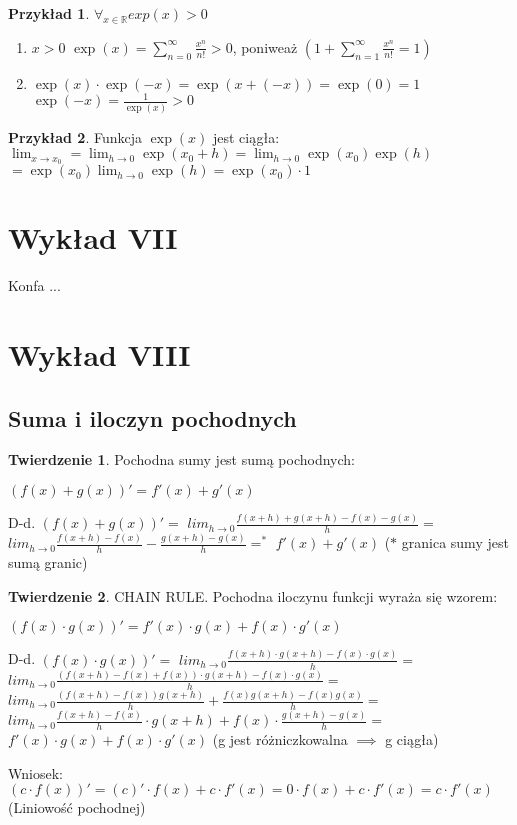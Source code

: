 \documentclass{article}
\theoremstyle{definition}
\theoremstyle{definition}
\newtheorem{tw}{Twierdzenie}[subsection]
\theoremstyle{definition}
\newtheorem{pk}{Przykład}[subsection]
\theoremstyle{definition}
\begin{document}
\begin{pk}
    $\forall_{x\in\mathbb{R}}  exp(x) > 0$
    \begin{enumerate}
        \item $x>0$ $\exp(x)=\sum_{n=0}^{\infty} \frac{x^n}{n!} > 0$, poniweaż  $(1+\sum_{n=1}^{\infty} \frac{x^n}{n!}=1)$
        \item $\exp(x)\cdot \exp(-x) = \exp(x+(-x)) = \exp(0) = 1$\\
        $\exp(-x) =\frac{1}{\exp(x)} > 0$
    \end{enumerate}
\end{pk}

\begin{pk}
    Funkcja $\exp(x)$ jest ciągła:\\
    $\lim_{x\rightarrow x_0}=\lim_{h\rightarrow 0} \exp(x_0+h) = \lim_{h\rightarrow 0} \exp(x_0)\exp(h)$\\
    $= \exp(x_0)\lim_{h\rightarrow 0} \exp(h) = \exp(x_0) \cdot 1$
\end{pk}

\section{Wykład VII}

Konfa ... 

\section{Wykład VIII}

\subsection{Suma i iloczyn pochodnych}

\begin{tw}
    Pochodna sumy jest sumą pochodnych:
    \begin{center}
        $(f(x)+g(x))'=f'(x)+g'(x)$
    \end{center}
    D-d.
    $(f(x)+g(x))'=$
    $lim_{h\rightarrow 0} \frac{f(x+h)+g(x+h)-f(x)-g(x)}{h}=$
    $lim_{h\rightarrow 0} \frac{f(x+h)-f(x)}{h} - \frac{g(x+h)-g(x)}{h}=^*$
    $f'(x)+g'(x)$ ($*$ granica sumy jest sumą granic)
\end{tw}

\begin{tw}
    CHAIN RULE. Pochodna iloczynu funkcji wyraża się wzorem:
    \begin{center}
        $(f(x)\cdot g(x))'=f'(x)\cdot g(x) + f(x)\cdot g'(x)$
    \end{center}
    D-d.
    $(f(x)\cdot g(x))'=$
    $lim_{h\rightarrow 0} \frac{f(x+h)\cdot g(x+h)-f(x)\cdot g(x)}{h}=$
    $lim_{h\rightarrow 0} \frac{(f(x+h)-f(x)+f(x))\cdot g(x+h)-f(x)\cdot g(x)}{h}=$
    $lim_{h\rightarrow 0} \frac{(f(x+h)-f(x))g(x+h)}{h} + \frac{f(x)g(x+h)-f(x)g(x)}{h}=$
    $lim_{h\rightarrow 0} \frac{f(x+h)-f(x)}{h}\cdot g(x+h) + f(x)\cdot \frac{g(x+h)-g(x)}{h}=$
    $f'(x)\cdot g(x) + f(x)\cdot g'(x)$ (g jest różniczkowalna $\implies$ g ciągła)
\end{tw}
Wniosek: $(c\cdot f(x))' = (c)'\cdot f(x) + c\cdot f'(x) = 0\cdot f(x) + c\cdot f'(x) = c\cdot f'(x)$ (Liniowość pochodnej)
\end{document}
